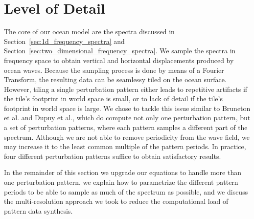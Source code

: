 \section{Level of Detail}

The core of our ocean model are the spectra discussed in 
Section~\ref{sec:1d_frequency_spectra} and 
Section~\ref{sec:two_dimensional_frequency_spectra}. We sample the spectra in 
frequency space to obtain vertical and horizontal displacements produced by 
ocean waves. Because the sampling process is done by means of a Fourier 
Transform, the resulting data can be seamlessy tiled on the ocean surface. 
However, tiling a single perturbation pattern either leads to repetitive 
artifacts if the tile's footprint in world space is small, or to lack of detail 
if the tile's footprint in world space is large. We chose to tackle this 
issue similar to Bruneton et al.\cite{misc:oceanlightingfft} and Dupuy et 
al.\cite{article:whitecaps}, which do compute not only one perturbation 
pattern, but a set of perturbation patterns, where each pattern samples a 
different part of the spectrum. Although we are not able to remove periodicity 
from the wave field, we may increase it to the least common multiple of the
pattern periods. In practice, four different perturbation patterns suffice to
obtain satisfactory results.

In the remainder of this section we upgrade our equations to handle more than
one perturbation pattern, we explain how to parametrize the different pattern
periods to be able to sample as much of the spectrum as possible, and we discuss
the multi-resolution approach we took to reduce the computational load of pattern
data synthesis.
